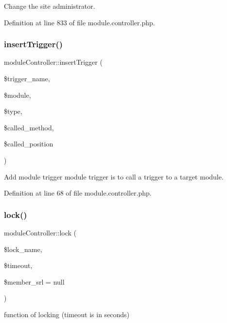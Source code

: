 Change the site administrator. 



Definition at line 833 of file module.\+controller.\+php.

\hypertarget{classmoduleController_ad4fb0e3cfddb064ffcc9d71f983066a9}{}\label{classmoduleController_ad4fb0e3cfddb064ffcc9d71f983066a9} 
\subsubsection{\texorpdfstring{insert\+Trigger()}{insertTrigger()}}
{\footnotesize\ttfamily module\+Controller\+::insert\+Trigger (\begin{DoxyParamCaption}\item[{}]{\$trigger\+\_\+name,  }\item[{}]{\$module,  }\item[{}]{\$type,  }\item[{}]{\$called\+\_\+method,  }\item[{}]{\$called\+\_\+position }\end{DoxyParamCaption})}



Add module trigger module trigger is to call a trigger to a target module. 



Definition at line 68 of file module.\+controller.\+php.

\hypertarget{classmoduleController_a1395c1be0ebed50078212640fba409be}{}\label{classmoduleController_a1395c1be0ebed50078212640fba409be} 
\subsubsection{\texorpdfstring{lock()}{lock()}}
{\footnotesize\ttfamily module\+Controller\+::lock (\begin{DoxyParamCaption}\item[{}]{\$lock\+\_\+name,  }\item[{}]{\$timeout,  }\item[{}]{\$member\+\_\+srl = {\ttfamily null} }\end{DoxyParamCaption})}



function of locking (timeout is in seconds) 



